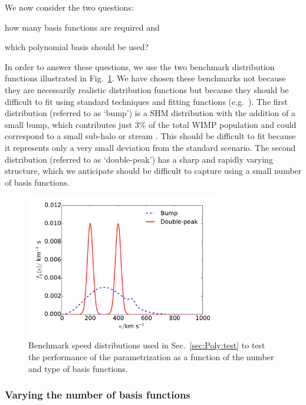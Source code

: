 We now consider the two questions: \begin{inparaenum} \item how many basis functions are required and \item which polynomial basis should be used? \end{inparaenum} In order to answer these questions, we use the two benchmark distribution functions illustrated in Fig.~\ref{fig:Poly:VaryingN_distributions}. We have chosen these benchmarks not because they are necessarily realistic distribution functions but because they should be difficult to fit using standard techniques and fitting functions (e.g.~\cite{Lisanti:2010}). The first distribution (referred to as `bump') is a SHM distribution with the addition of a small bump, which contributes just 3\% of the total WIMP population and could correspond to a small sub-halo or stream \cite{Vogelsberger:2009}. This should be difficult to fit because it represents only a very small deviation from the standard scenario. The second distribution (referred to as `double-peak') has a sharp and rapidly varying structure, which we anticipate should be difficult to capture using a small number of basis functions.

\begin{figure}[t]
\centering
  \includegraphics[width=0.75\textwidth]{Poly/SpeedDistributions-VaryingN.pdf}
  \caption{Benchmark speed distributions used in Sec.~\ref{sec:Poly:test} to test the performance of the parametrization as a function of the number and type of basis functions.}
  \label{fig:Poly:VaryingN_distributions}
\end{figure}

\subsubsection{Varying the number of basis functions}

